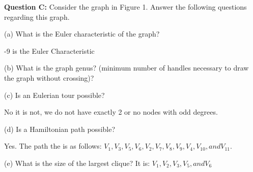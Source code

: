 \documentclass[12pt]{article}
\begin{document}
\bigskip
\noindent
\textbf{Question C:} Consider the graph in Figure 1. Answer the following questions regarding this graph.\smallskip

\smallskip
\noindent
(a) What is the Euler characteristic of the graph?\smallskip

-9 is the Euler Characteristic

\smallskip
\noindent
(b) What is the graph genus? (minimum number of handles necessary to draw the graph without crossing)?\smallskip

\smallskip
\noindent
(c) Is an Eulerian tour possible?\smallskip

No it is not, we do not have exactly 2 or no nodes with odd degrees. \smallskip

\smallskip
\noindent
(d) Is a Hamiltonian path possible?\smallskip

Yes. The path the is as follows: $V_1, V_3, V_5, V_6, V_2, V_7, V_8, V_9, V_4, V_10, and V_11$. \smallskip

\smallskip
\noindent
(e) What is the size of the largest clique?
\smallskip
It is: $V_1, V_2, V_3, V_5, and V_6$
\end{document}
